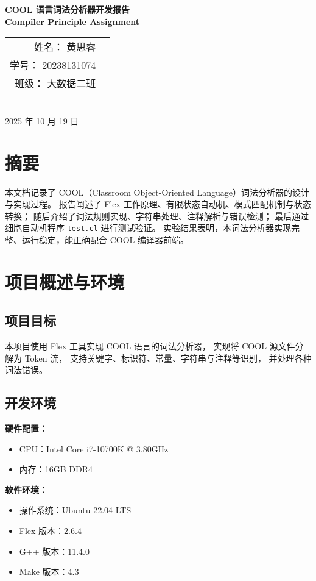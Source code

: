 \documentclass[a4paper,12pt]{article}
\begin{document}
\begin{center}
    \vspace*{2cm}
    {\Huge \textbf{COOL 语言词法分析器开发报告}}\\[1.5cm]
    {\Large \textbf{Compiler Principle Assignment}}\\[2cm]
    \begin{tabular}{rl}
        姓名： 黄思睿& \underline{\hspace{8cm}} \\[0.8cm]
        学号： 20238131074 & \underline{\hspace{8cm}} \\[0.8cm]
        班级： 大数据二班& \underline{\hspace{8cm}} \\[0.8cm]
    \end{tabular}\\[2cm]
    2025 年 10 月 19 日
\end{center}

\newpage
\section*{摘要}
本文档记录了 COOL（Classroom Object-Oriented Language）词法分析器的设计与实现过程。
报告阐述了 Flex 工作原理、有限状态自动机、模式匹配机制与状态转换；
随后介绍了词法规则实现、字符串处理、注释解析与错误检测；
最后通过细胞自动机程序 \texttt{test.cl} 进行测试验证。
实验结果表明，本词法分析器实现完整、运行稳定，能正确配合 COOL 编译器前端。

\newpage
\tableofcontents
\newpage

\section{项目概述与环境}
\subsection{项目目标}
本项目使用 Flex 工具实现 COOL 语言的词法分析器，
实现将 COOL 源文件分解为 Token 流，
支持关键字、标识符、常量、字符串与注释等识别，
并处理各种词法错误。

\subsection{开发环境}
\textbf{硬件配置：}
\begin{itemize}
    \item CPU：Intel Core i7-10700K @ 3.80GHz
    \item 内存：16GB DDR4
\end{itemize}
\textbf{软件环境：}
\begin{itemize}
    \item 操作系统：Ubuntu 22.04 LTS
    \item Flex 版本：2.6.4
    \item G++ 版本：11.4.0
    \item Make 版本：4.3
\end{itemize}
\end{document}
